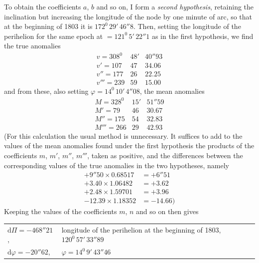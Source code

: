 To obtain the coefficients $a$, $b$ and so on, I form a \textit{second hypothesis}, retaining the inclination but increasing the longitude of the node by one minute of arc, so that at the beginning of 1803 it is $172^0\,29'\,46''8$. Then, setting the longitude of the perihelion for the same epoch at $=121^0\,5'\,22''1$ as in the first hypothesis, we find the true anomalies
\[
\begin{array}{rrr}
v=308^0&48'&40''93\\
v'=107&47&34.06\\
v''=177&26&22.25\\
v'''=239&59&15.00
\end{array}
\]
and from these, also setting $\varphi=14^0\,10'\,4''08$, the mean anomalies
\[
\begin{array}{rrr}
M=328^0&15'&51''59\\
M'=79&46&30.67\\
M''=175&54&32.83\\
M'''=266&29&42.93
\end{array}
\]
(For this calculation the usual method is unnecessary. It suffices to add to the values of the mean anomalies found under the first hypothesis the products of the coefficients $m$, $m'$, $m''$, $m'''$, taken as positive, and the differences between the corresponding values of the true anomalies in the two hypotheses, namely
\[
\begin{aligned}
+9''50\times0.68517&=+6''51\\
+3.40\times1.06482&=+3.62\\
+2.48\times1.59701&=+3.96\\
-12.39\times1.18352&=-14.66)
\end{aligned}
\]
Keeping the values of the coefficients $m$, $n$ and so on then gives
\par\nobreak\smallskip
\noindent\hspace*{.06\linewidth}%
{\fontsize{9}{11}\selectfont\begin{tabular}[t]{@{}p{.20\linewidth}@{\enspace}p{.70\linewidth}@{}}
$\mathrm d\Pi=-468''21$,&longitude of the perihelion at the beginning of 1803, $120^0\,57'\,33''89$\\
$\mathrm d\varphi=-20''62$,&\hspace*{.30\linewidth}$\varphi=14^0\,9'\,43''46$
\end{tabular}}\par\nobreak\smallskip
\par\nobreak\smallskip
\noindent\hspace*{.06\linewidth}%
